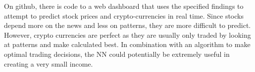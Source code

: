 \documentclass[12pt]{article}
\begin{document}
On github, there is code to a web dashboard that uses the specified findings to attempt to predict stock prices and crypto-currencies in real time. Since stocks depend more on the news and less on patterns, they are more difficult to predict. However, crypto currencies are perfect as they are usually only traded by looking at patterns and make calculated best. In combination with an algorithm to make optimal trading decisions, the NN could potentially be extremely useful in creating a very small income. 
 
\nocite{sas} 
 
\newpage

 



\end{document}
